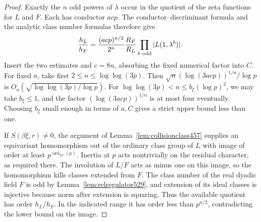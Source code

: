 \documentclass[a4paper,11pt]{article}
\theoremstyle{definition}
\theoremstyle{remark}
\numberwithin{equation}{section}
\begin{document}
\begin{proof}
Exactly the \(n\) odd powers of \(\lambda\) occur in the
quotient of the zeta functions for \(L\) and \(F\). Each
has conductor \(acp\). The conductor--discriminant formula
and the analytic class number formulas therefore give
\[
     \frac{h_L}{h_F}
       =\frac{(acp)^{n/2}}{2^n}\frac{R_F}{R_L}
                   \prod_{b\ {\rm odd}}|L(1,\lambda^b)|.
\]
Insert the two estimates and \(c=8n\), absorbing the fixed
numerical factor into \(C\). For fixed \(a\), take first
\(2\le n\le\log\log(3p)\). Then
\(\sqrt n(\log(3acp))^{1/n}/\log p\)
is \(O_a(\sqrt{\log\log(3p)/\log p})\).
For \(\log\log(3p)<n\le b_\xi(\log p)^2\), we may take
\(b_\xi\le1\), and the factor \((\log(3acp))^{1/n}\)
is at most four eventually. Choosing \(b_\xi\) small enough
in terms of \(a,C\) gives a strict upper bound less than one.

If \(S(\beta\xi,r)\ne0\), the argument of
Lemma~\ref{lem:collisionclass457} supplies an equivariant
homomorphism out of the ordinary class group of \(L\) with
image of order at least \(p^{\operatorname{ord}_{2n}(p)}\).
Inertia at \(p\) acts nontrivially on the residual character,
as required there. The involution of \(L/F\) acts as minus
one on this image, so the homomorphism kills classes extended
from \(F\). The class number of the real dyadic field \(F\)
is odd by Lemma~\ref{lem:relregulator529}, and extension of
its ideal classes is injective because norm after extension
is squaring. Thus the available quotient has order \(h_L/h_F\).
In the indicated range it has order less than \(p^{n/2}\),
contradicting the lower bound on the image.
\end{proof}
\end{document}
